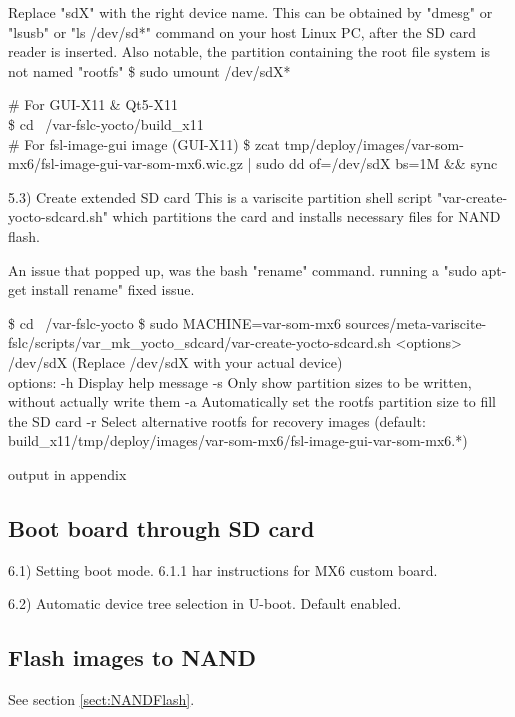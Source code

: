 \documentclass[10pt]{article}
\begin{document}
    Replace "sdX" with the right device name. This can be obtained by "dmesg" or "lsusb" or "ls /dev/sd*" command on your host Linux PC,
    after the SD card reader is inserted.
    Also notable, the partition containing the root file system is not named "rootfs"
        \$ sudo umount /dev/sdX*

        \# For GUI-X11 \& Qt5-X11\\
        \$ cd ~/var-fslc-yocto/build\_x11\\

        \# For fsl-image-gui image (GUI-X11)
        \$ zcat tmp/deploy/images/var-som-mx6/fsl-image-gui-var-som-mx6.wic.gz | sudo dd of=/dev/sdX bs=1M \&\& sync

5.3) Create extended SD card
    This is a variscite partition shell script "var-create-yocto-sdcard.sh" which partitions the card and installs necessary files for NAND flash.

    An issue that popped up, was the bash "rename" command. running a "sudo apt-get install rename" fixed issue.

        \$ cd ~/var-fslc-yocto
        \$ sudo MACHINE=var-som-mx6 sources/meta-variscite-fslc/scripts/var\_mk\_yocto\_sdcard/var-create-yocto-sdcard.sh <options> /dev/sdX
        (Replace /dev/sdX with your actual device)
\\
        options:
         -h            Display help message
         -s            Only show partition sizes to be written, without actually write them
         -a            Automatically set the rootfs partition size to fill the SD card
         -r            Select alternative rootfs for recovery images (default: build\_x11/tmp/deploy/images/var-som-mx6/fsl-image-gui-var-som-mx6.*)

    output in appendix%

\subsection{ Boot board through SD card}

6.1) Setting boot mode. 6.1.1 har instructions for MX6 custom board.

6.2) Automatic device tree selection in U-boot. Default enabled.

\subsection{Flash images to NAND}
See section \ref{sect:NANDFlash}.
\end{document}
